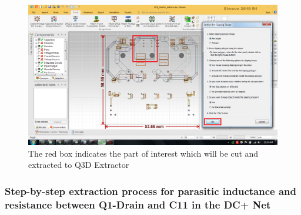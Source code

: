 \begin{enumerate}
\begin{figure} [H]
  \centering
  \includegraphics[width=\linewidth]{pictures/examples/siwave_clip2.png}
  \caption{The red box indicates the part of interest which will be cut and extracted to Q3D Extractor}
  \label{fig:siwave_cut}
\end{figure}

\end{enumerate}

\subsubsection{Step-by-step extraction process for parasitic inductance and resistance between Q1-Drain and C11 in the DC+ Net}


